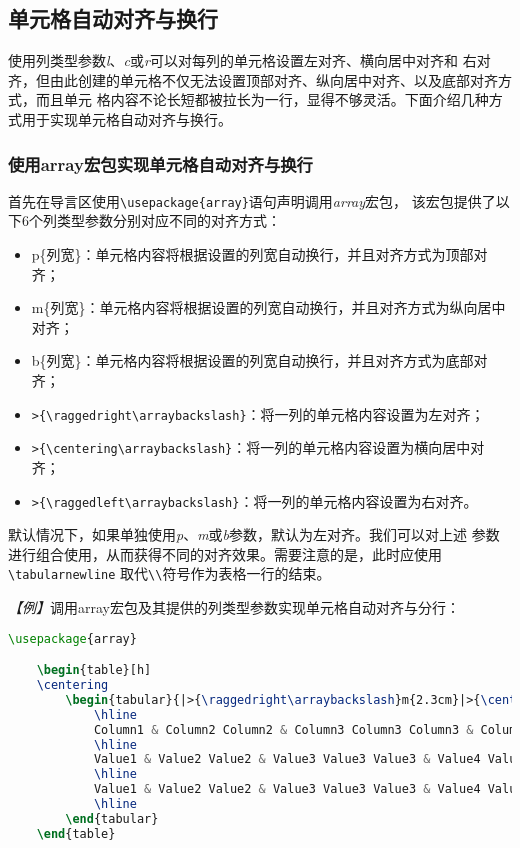 \subsection{单元格自动对齐与换行}

使用列类型参数\emph{l}、\emph{c}或\emph{r}可以对每列的单元格设置左对齐、横向居中对齐和
右对齐，但由此创建的单元格不仅无法设置顶部对齐、纵向居中对齐、以及底部对齐方式，而且单元
格内容不论长短都被拉长为一行，显得不够灵活。下面介绍几种方式用于实现单元格自动对齐与换行。

\subsubsection{使用array宏包实现单元格自动对齐与换行}

首先在导言区使用\texttt{\textbackslash{}usepackage\{array\}}语句声明调用\emph{array}宏包，
该宏包提供了以下6个列类型参数分别对应不同的对齐方式：
\begin{itemize}
    \item p\{列宽\}：单元格内容将根据设置的列宽自动换行，并且对齐方式为顶部对齐；
    \item m\{列宽\}：单元格内容将根据设置的列宽自动换行，并且对齐方式为纵向居中对齐；
    \item b\{列宽\}：单元格内容将根据设置的列宽自动换行，并且对齐方式为底部对齐；
    \item \texttt{>\{\textbackslash{}raggedright\textbackslash{}arraybackslash\}}：将一列的单元格内容设置为左对齐；
    \item \texttt{>\{\textbackslash{}centering\textbackslash{}arraybackslash\}}：将一列的单元格内容设置为横向居中对齐；
    \item \texttt{>\{\textbackslash{}raggedleft\textbackslash{}arraybackslash\}}：将一列的单元格内容设置为右对齐。
\end{itemize}

默认情况下，如果单独使用\emph{p}、\emph{m}或\emph{b}参数，默认为左对齐。我们可以对上述
参数进行组合使用，从而获得不同的对齐效果。需要注意的是，此时应使用\texttt{\textbackslash{}tabularnewline}
取代\texttt{\textbackslash{}\textbackslash{}}符号作为表格一行的结束。

\emph{【例】}调用array宏包及其提供的列类型参数实现单元格自动对齐与分行：
\begin{lstlisting}[language=TeX]
    \usepackage{array}

    \begin{table}[h]
    \centering
        \begin{tabular}{|>{\raggedright\arraybackslash}m{2.3cm}|>{\centering\arraybackslash}m{2.3cm}|>{\centering}m{2.3cm}|>{\raggedleft\arraybackslash}m{2.3cm}|}
            \hline
            Column1 & Column2 Column2 & Column3 Column3 Column3 & Column4 Column4 Column4 Column4 \tabularnewline
            \hline
            Value1 & Value2 Value2 & Value3 Value3 Value3 & Value4 Value4 Value4 Value4 \tabularnewline
            \hline
            Value1 & Value2 Value2 & Value3 Value3 Value3 & Value4 Value4 Value4 Value4 \tabularnewline
            \hline
        \end{tabular}
    \end{table}
\end{lstlisting}

